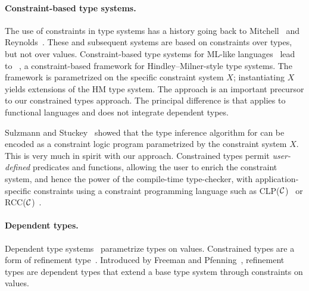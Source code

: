 

\paragraph{Constraint-based type systems.}

The use of constraints in type systems has a history
going back to Mitchell~\cite{mitchell84} and
Reynolds~\cite{reynolds85}.  These and subsequent systems
are based on
constraints over types, but not over values.
Constraint-based type systems for ML-like
languages~\cite{trifonov96,pottier96simplifying}
lead to \hmx~\cite{sulzmann97type}, a constraint-based framework for
Hindley--Milner-style type systems.
The framework is parametrized on
the specific constraint system $X$; instantiating $X$ yields
extensions of the HM type system.
The \hmx{} approach is an important precursor to
our constrained types approach. The principal difference is that
\hmx{} applies to functional languages and does not integrate
dependent types.

Sulzmann and Stuckey~\cite{sulzmann-hmx-clpx} showed that the
type inference algorithm for \hmx can be encoded as a
constraint logic program parametrized by the constraint system
$X$. This is very much in spirit with our approach.
Constrained types permit {\em user-defined}
predicates and functions, allowing the user to enrich
the constraint system, and hence the power of the compile-time type-checker,
with application-specific constraints using a constraint
programming language such as CLP($\cal C$)~\cite{clp} or 
RCC($\cal C$)~\cite{DBLP:conf/fsttcs/JagadeesanNS05}.

\paragraph{Dependent types.}

Dependent type
systems~\cite{xi99dependent,calc-constructions,epigram,cayenne}
param\-etrize types on values.  Constrained types are a form of refinement
type~\cite{refinement-types,conditional-types,jones94,sized-types,flanagan-popl06,flanagan-fool06,liquid-types}.
Introduced by Freeman and Pfenning~\cite{refinement-types},
refinement types
are dependent types that extend a base type system through constraints on values.

